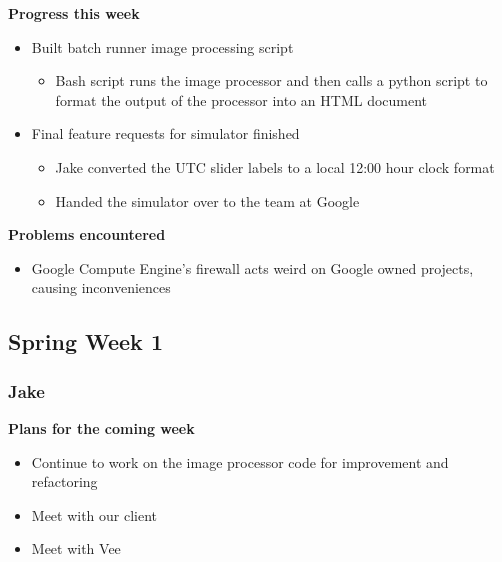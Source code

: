\documentclass[10pt, onecolumn, draftclsnofoot, letterpaper, compsoc]{IEEEtran}
\begin{document}
    \noindent \textbf{Progress this week}

    \begin{itemize}

    \item Built batch runner image processing script
    \begin{itemize}
      \item Bash script runs the image processor and then calls a python script to format the output of the processor into an HTML document
    \end{itemize}

    \item Final feature requests for simulator finished
    \begin{itemize}
     \item Jake converted the UTC slider labels to a local 12:00 hour clock format
     \item Handed the simulator over to the team at Google
    \end{itemize}

    \end{itemize}

    \noindent \textbf{Problems encountered}

    \begin{itemize}

    \item Google Compute Engine's firewall acts weird on Google owned projects, causing inconveniences

    \end{itemize}

\subsection{Spring Week 1}

    \subsubsection{Jake}

    \noindent \textbf{Plans for the coming week}

    \begin{itemize}

    \item Continue to work on the image processor code for improvement and refactoring
    \item Meet with our client
    \item Meet with Vee

    \end{itemize}
\end{document}
